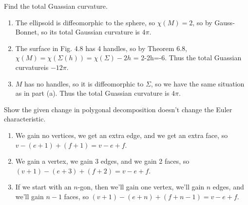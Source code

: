 \documentclass[10pt]{report}
\begin{document}

\begin{exer}[7.6: 1]
Find the total Guassian curvature.
\end{exer}
\begin{enumerate}
	\item The ellipsoid is diffeomorphic to the sphere, so $\chi(M)=2$, so by Gauss-Bonnet, so its total Gaussian curvature is $4\pi$.
	\item The surface in Fig. 4.8 has 4 handles, so by Theorem 6.8, $\chi(M)=\chi(\Sigma(h))=\chi(\Sigma)-2h$ = 2-2h=-6. Thus the total Guassian curvatureis $-12\pi$.
	\item $M$ has no handles, so it is diffeomorphic to $\Sigma$, so we have the same situation as in part (a). Thus the total Guassian curvature is $4\pi$.
\end{enumerate}

\begin{exer}[7.6:5]
Show the given change in polygonal decomposition doesn't change the Euler characteristic.
\end{exer}
\begin{enumerate}
	\item We gain no vertices, we get an extra edge, and we get an extra face, so $v-(e+1)+(f+1)=v-e+f$.
	\item We gain a vertex, we gain 3 edges, and we gain 2 faces, so $(v+1)-(e+3)+(f+2)=v-e+f$.
	\item If we start with an $n$-gon, then we'll gain one vertex, we'll gain $n$ edges, and we'll gain $n-1$ faces, so $(v+1)-(e+n)+(f+n-1)=v-e+f$.
\end{enumerate}
\end{document}
